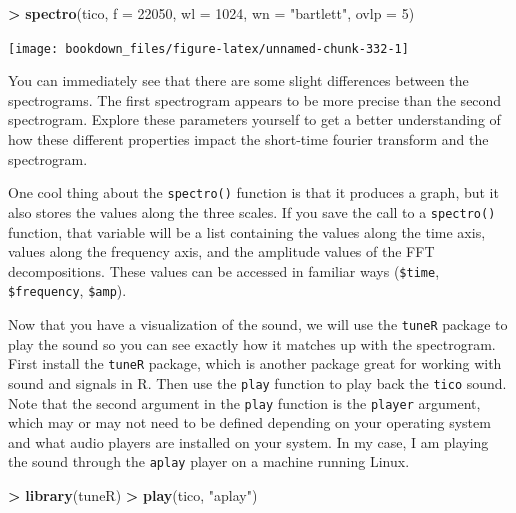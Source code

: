 \documentclass[
]{krantz}
\makeatletter
\newenvironment{Shaded}{\begin{snugshade}}{\end{snugshade}}
\newcommand{\DataTypeTok}[1]{\textcolor[rgb]{0.27,0.27,0.27}{#1}}
\newcommand{\DecValTok}[1]{\textcolor[rgb]{0.06,0.06,0.06}{#1}}
\newcommand{\KeywordTok}[1]{\textcolor[rgb]{0.27,0.27,0.27}{\textbf{#1}}}
\newcommand{\NormalTok}[1]{#1}
\newcommand{\OperatorTok}[1]{\textcolor[rgb]{0.43,0.43,0.43}{\textbf{#1}}}
\newcommand{\StringTok}[1]{\textcolor[rgb]{0.5,0.5,0.5}{#1}}
\newenvironment{kframe}{%
\medskip{}
\setlength{\fboxsep}{.8em}
 \def\at@end@of@kframe{}%
 \ifinner\ifhmode%
  \def\at@end@of@kframe{\end{minipage}}%
  \begin{minipage}{\columnwidth}%
 \fi\fi%
 \def\FrameCommand##1{\hskip\@totalleftmargin \hskip-\fboxsep
 \colorbox{shadecolor}{##1}\hskip-\fboxsep
     \hskip-\linewidth \hskip-\@totalleftmargin \hskip\columnwidth}%
 \MakeFramed {\advance\hsize-\width
   \@totalleftmargin\z@ \linewidth\hsize
   \@setminipage}}%
 {\par\unskip\endMakeFramed%
 \at@end@of@kframe}
\renewenvironment{Shaded}{\begin{kframe}}{\end{kframe}}
\makeatother
\begin{document}
\begin{Shaded}
\begin{Highlighting}[]
\OperatorTok{\textgreater{}}\StringTok{ }\KeywordTok{spectro}\NormalTok{(tico, }\DataTypeTok{f =} \DecValTok{22050}\NormalTok{, }\DataTypeTok{wl =} \DecValTok{1024}\NormalTok{, }\DataTypeTok{wn =} \StringTok{"bartlett"}\NormalTok{, }\DataTypeTok{ovlp =} \DecValTok{5}\NormalTok{)}
\end{Highlighting}
\end{Shaded}

\texttt{[image: bookdown\_files/figure-latex/unnamed-chunk-332-1]}

You can immediately see that there are some slight differences between the spectrograms. The first spectrogram appears to be more precise than the second spectrogram. Explore these parameters yourself to get a better understanding of how these different properties impact the short-time fourier transform and the spectrogram.

One cool thing about the \texttt{spectro()} function is that it produces a graph, but it also stores the values along the three scales. If you save the call to a \texttt{spectro()} function, that variable will be a list containing the values along the time axis, values along the frequency axis, and the amplitude values of the FFT decompositions. These values can be accessed in familiar ways (\texttt{\$time}, \texttt{\$frequency}, \texttt{\$amp}).

Now that you have a visualization of the sound, we will use the \texttt{tuneR} package to play the sound so you can see exactly how it matches up with the spectrogram. First install the \texttt{tuneR} package, which is another package great for working with sound and signals in R. Then use the \texttt{play} function to play back the \texttt{tico} sound. Note that the second argument in the \texttt{play} function is the \texttt{player} argument, which may or may not need to be defined depending on your operating system and what audio players are installed on your system. In my case, I am playing the sound through the \texttt{aplay} player on a machine running Linux.

\begin{Shaded}
\begin{Highlighting}[]
\OperatorTok{\textgreater{}}\StringTok{ }\KeywordTok{library}\NormalTok{(tuneR)}
\OperatorTok{\textgreater{}}\StringTok{ }\KeywordTok{play}\NormalTok{(tico, }\StringTok{"aplay"}\NormalTok{)}
\end{Highlighting}
\end{Shaded}
\end{document}
